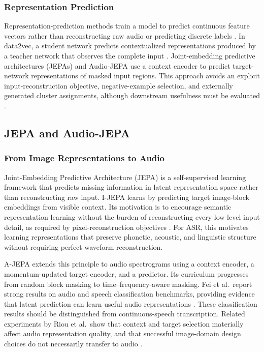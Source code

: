 \documentclass[conference]{IEEEtran}
\begin{document}
\subsubsection{Representation Prediction}

Representation-prediction methods train a model to predict continuous feature vectors rather than reconstructing raw audio or predicting discrete labels \cite{baevski2022data2vec,lecun2022path,assran2023ijepa,tuncay2025audiojepa}. In data2vec, a student network predicts contextualized representations produced by a teacher network that observes the complete input \cite{baevski2022data2vec}. Joint-embedding predictive architectures (JEPAs) \cite{lecun2022path,assran2023ijepa} and Audio-JEPA \cite{tuncay2025audiojepa} use a context encoder to predict target-network representations of masked input regions. This approach avoids an explicit input-reconstruction objective, negative-example selection, and externally generated cluster assignments, although downstream usefulness must be evaluated \cite{baevski2020wav2vec2,hsu2021hubert,tuncay2025audiojepa}.

\subsection{JEPA and Audio-JEPA}

\subsubsection{From Image Representations to Audio}
Joint-Embedding Predictive Architecture (JEPA) is a self-supervised learning framework that predicts missing information in latent representation space rather than reconstructing raw input. I-JEPA learns by predicting target image-block embeddings from visible context. Its motivation is to encourage semantic representation learning without the burden of reconstructing every low-level input detail, as required by pixel-reconstruction objectives \cite{assran2023ijepa}. For ASR, this motivates learning representations that preserve phonetic, acoustic, and linguistic structure without requiring perfect waveform reconstruction.

A-JEPA extends this principle to audio spectrograms using a context encoder, a momentum-updated target encoder, and a predictor. Its curriculum progresses from random block masking to time--frequency-aware masking. Fei et al.\ report strong results on audio and speech classification benchmarks, providing evidence that latent prediction can learn useful audio representations \cite{fei2023ajepa}. These classification results should be distinguished from continuous-speech transcription. Related experiments by Riou et al.\ show that context and target selection materially affect audio representation quality, and that successful image-domain design choices do not necessarily transfer to audio \cite{riou2024audiojepa}.
\end{document}
